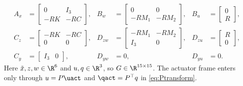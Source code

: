{\footnotesize
\setlength{\arraycolsep}{2.5pt}
\begin{equation}
\begin{aligned}
 A_x&=\begin{bmatrix}0&I_3\\-RK&-RC\end{bmatrix},
&B_w&=\begin{bmatrix}0&0\\-RM_1&-RM_2\end{bmatrix},
&B_u&=\begin{bmatrix}0\\R\end{bmatrix},\\
 C_z&=\begin{bmatrix}-RK&-RC\\0&0\end{bmatrix},
&D_{zw}&=\begin{bmatrix}-RM_1&-RM_2\\I_3&0\end{bmatrix},
&D_{zu}&=\begin{bmatrix}R\\0\end{bmatrix},\\
 C_y&=\begin{bmatrix}I_3&0\end{bmatrix},
&D_{yw}&=0,
&D_{yu}&=0.
\end{aligned}
\label{eq:app_lfr_blocks}
\end{equation}
}
Here $\tilde x,z,w\in\R^6$ and $u,q\in\R^3$, so $G\in\R^{15\times15}$.
The actuator frame enters only through $u=P\uact$ and $\qact=P^\top q$ in
\eqref{eq:Ptransform}.

